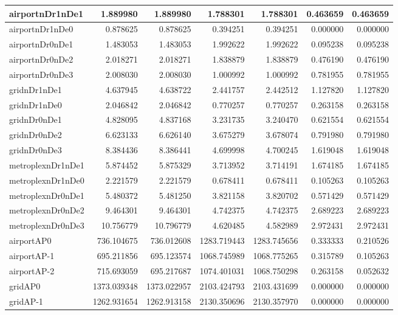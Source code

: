 \begin{longtable}{|l|r|r|r|r|r|r|}
\endlastfoot
airportnDr1nDe1 & 1.889980 & 1.889980 & 1.788301 & 1.788301 & 0.463659 & 0.463659 \\ \hline
airportnDr1nDe0 & 0.878625 & 0.878625 & 0.394251 & 0.394251 & 0.000000 & 0.000000 \\ \hline
airportnDr0nDe1 & 1.483053 & 1.483053 & 1.992622 & 1.992622 & 0.095238 & 0.095238 \\ \hline
airportnDr0nDe2 & 2.018271 & 2.018271 & 1.838879 & 1.838879 & 0.476190 & 0.476190 \\ \hline
airportnDr0nDe3 & 2.008030 & 2.008030 & 1.000992 & 1.000992 & 0.781955 & 0.781955 \\ \hline
gridnDr1nDe1 & 4.637945 & 4.638722 & 2.441757 & 2.442512 & 1.127820 & 1.127820 \\ \hline
gridnDr1nDe0 & 2.046842 & 2.046842 & 0.770257 & 0.770257 & 0.263158 & 0.263158 \\ \hline
gridnDr0nDe1 & 4.828095 & 4.837168 & 3.231735 & 3.240470 & 0.621554 & 0.621554 \\ \hline
gridnDr0nDe2 & 6.623133 & 6.626140 & 3.675279 & 3.678074 & 0.791980 & 0.791980 \\ \hline
gridnDr0nDe3 & 8.384436 & 8.386441 & 4.699998 & 4.700245 & 1.619048 & 1.619048 \\ \hline
metroplexnDr1nDe1 & 5.874452 & 5.875329 & 3.713952 & 3.714191 & 1.674185 & 1.674185 \\ \hline
metroplexnDr1nDe0 & 2.221579 & 2.221579 & 0.678411 & 0.678411 & 0.105263 & 0.105263 \\ \hline
metroplexnDr0nDe1 & 5.480372 & 5.481250 & 3.821158 & 3.820702 & 0.571429 & 0.571429 \\ \hline
metroplexnDr0nDe2 & 9.464301 & 9.464301 & 4.742375 & 4.742375 & 2.689223 & 2.689223 \\ \hline
metroplexnDr0nDe3 & 10.756779 & 10.796779 & 4.620485 & 4.582989 & 2.972431 & 2.972431 \\ \hline
airportAP0 & 736.104675 & 736.012608 & 1283.719443 & 1283.745656 & 0.333333 & 0.210526 \\ \hline
airportAP-1 & 695.211856 & 695.123574 & 1068.745989 & 1068.775265 & 0.315789 & 0.105263 \\ \hline
airportAP-2 & 715.693059 & 695.217687 & 1074.401031 & 1068.750298 & 0.263158 & 0.052632 \\ \hline
gridAP0 & 1373.039348 & 1373.022957 & 2103.424793 & 2103.431699 & 0.000000 & 0.000000 \\ \hline
gridAP-1 & 1262.931654 & 1262.913158 & 2130.350696 & 2130.357970 & 0.000000 & 0.000000 \\ \hline

\end{longtable}
